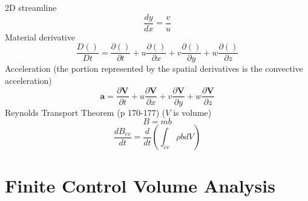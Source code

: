 \documentclass{article}
\begin{document}
2D streamline 
\begin{equation}
    \frac{dy}{dx}=\frac{v}{u}
\end{equation}
\newline
\newline
Material derivative
\begin{equation}
    \frac{D()}{Dt} = \frac{\partial()}{\partial t} + u\frac{\partial()}{\partial x} + v\frac{\partial()}{\partial y} + w\frac{\partial()}{\partial z}
\end{equation}
\newline
\newline
Acceleration (the portion represented by the spatial derivatives is the convective acceleration)
\begin{equation}
    \mathbf{a} = \frac{\partial\mathbf{V}}{\partial t} + u\frac{\partial\mathbf{V}}{\partial x} + v\frac{\partial\mathbf{V}}{\partial y} + w\frac{\partial\mathbf{V}}{\partial z}
\end{equation}
\newline
\newline
Reynolds Transport Theorem (p 170-177) ($V$ is volume)
\begin{equation}
    B=mb
\end{equation}
\begin{equation}
    \frac{dB_{cv}}{dt}=\frac{d}{dt}\left(\int_{cv}\rho b dV\right)
\end{equation}
    

%
%
\newpage
\section{Finite Control Volume Analysis}
\end{document}
